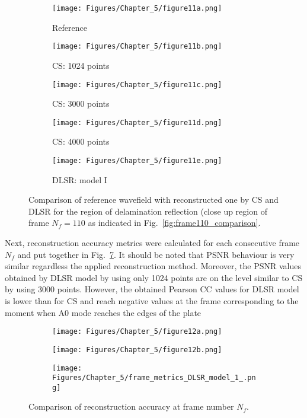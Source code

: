 \begin{figure} [h!]
	\centering
	\begin{subfigure}[b]{0.32\textwidth}
		\centering
		\texttt{[image: Figures/Chapter\_5/figure11a.png]}
		\caption{Reference}
		\label{fig:frame110delam_ref}
	\end{subfigure}
	\hfill
	\begin{subfigure}[b]{0.32\textwidth}
		\centering
		\texttt{[image: Figures/Chapter\_5/figure11b.png]}
		\caption{CS: 1024 points}
		\label{fig:frame110delam_CS1024}
	\end{subfigure}
	\hfill
	\begin{subfigure}[b]{0.32\textwidth}
		\centering
		\texttt{[image: Figures/Chapter\_5/figure11c.png]}
		\caption{CS: 3000 points}
		\label{fig:frame110delam_CS3000}
	\end{subfigure}	
	\hfill
	\begin{subfigure}[b]{0.32\textwidth}
		\centering
		\texttt{[image: Figures/Chapter\_5/figure11d.png]}
		\caption{CS: 4000 points}
		\label{fig:frame110delam_CS4000}
	\end{subfigure}
	\begin{subfigure}[b]{0.32\textwidth}
		\centering
		\texttt{[image: Figures/Chapter\_5/figure11e.png]}
		\caption{DLSR: model I}
		\label{fig:frame110delam_Abdalraheem}
	\end{subfigure}
	\caption{Comparison of reference wavefield with reconstructed one by CS and DLSR for the region of delamination reflection (close up region of frame $N_f = 110$ as indicated in Fig.~\ref{fig:frame110_comparison}.}
	\label{fig:frame110del_comparison}
\end{figure} 
\clearpage

Next, reconstruction accuracy metrics were calculated for each consecutive frame $N_f$ and put together in Fig.~\ref{fig:frame_metrics}.
It should be noted that PSNR behaviour is very similar regardless the applied reconstruction method.
Moreover, the PSNR values obtained by DLSR model by using only 1024 points are on the level similar to CS by using 3000 points.
However, the obtained Pearson CC values for DLSR model is lower than for CS and reach negative values at the frame corresponding to the moment when A0 mode reaches the edges of the plate
\begin{figure} [h!]
	\centering
	\begin{subfigure}[b]{1\textwidth}
		\centering
		\texttt{[image: Figures/Chapter\_5/figure12a.png]}
	\end{subfigure}
	\vfill
	\begin{subfigure}[b]{1\textwidth}
		\centering
		\texttt{[image: Figures/Chapter\_5/figure12b.png]}
	\end{subfigure}
	\vfill
	\begin{subfigure}[b]{1\textwidth}
		\centering
		\texttt{[image: Figures/Chapter\_5/frame\_metrics\_DLSR\_model\_1\_.png]}
	\end{subfigure}	
	\caption{Comparison of reconstruction accuracy at frame number $N_f$.}
	\label{fig:frame_metrics}
\end{figure}

